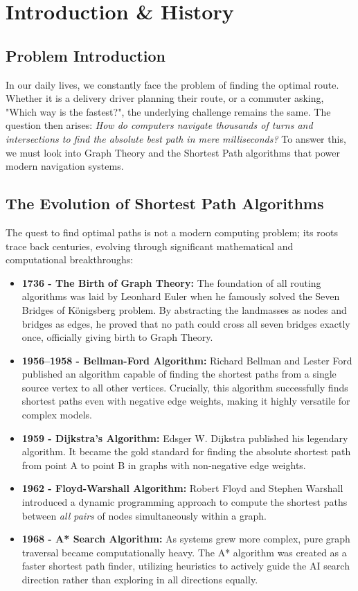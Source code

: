 \section{Introduction \& History}

\subsection{Problem Introduction}
In our daily lives, we constantly face the problem of finding the optimal route. Whether it is a delivery driver planning their route, or a commuter asking, "Which way is the fastest?", the underlying challenge remains the same. The question then arises: \textit{How do computers navigate thousands of turns and intersections to find the absolute best path in mere milliseconds?} To answer this, we must look into Graph Theory and the Shortest Path algorithms that power modern navigation systems.

\subsection{The Evolution of Shortest Path Algorithms}
The quest to find optimal paths is not a modern computing problem; its roots trace back centuries, evolving through significant mathematical and computational breakthroughs:

\begin{itemize}
    \item \textbf{1736 - The Birth of Graph Theory:} The foundation of all routing algorithms was laid by Leonhard Euler when he famously solved the Seven Bridges of Königsberg problem. By abstracting the landmasses as nodes and bridges as edges, he proved that no path could cross all seven bridges exactly once, officially giving birth to Graph Theory.
    
    \item \textbf{1956--1958 - Bellman-Ford Algorithm:} Richard Bellman and Lester Ford published an algorithm capable of finding the shortest paths from a single source vertex to all other vertices. Crucially, this algorithm successfully finds shortest paths even with negative edge weights, making it highly versatile for complex models.
    
    \item \textbf{1959 - Dijkstra's Algorithm:} Edsger W. Dijkstra published his legendary algorithm. It became the gold standard for finding the absolute shortest path from point A to point B in graphs with non-negative edge weights.
    
    \item \textbf{1962 - Floyd-Warshall Algorithm:} Robert Floyd and Stephen Warshall introduced a dynamic programming approach to compute the shortest paths between \textit{all pairs} of nodes simultaneously within a graph.
    
    \item \textbf{1968 - A* Search Algorithm:} As systems grew more complex, pure graph traversal became computationally heavy. The A* algorithm was created as a faster shortest path finder, utilizing heuristics to actively guide the AI search direction rather than exploring in all directions equally.
\end{itemize}

